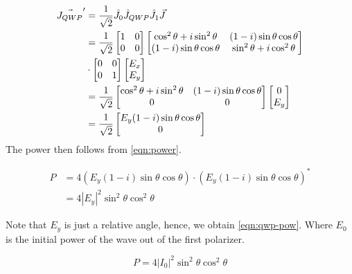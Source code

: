 \documentclass[aip, cp, amsmath, amssymb, reprint]{revtex4-2}
\begin{document}
        \begin{align*}
            \vec{J_{QWP}}' &= \frac{1}{\sqrt{2}}\hat{J_0}\hat{J}_{QWP}\hat{J}_1\vec{J} \\
            &= \frac{1}{\sqrt{2}}\begin{bmatrix} 1 & 0 \\ 0 & 0\end{bmatrix}\begin{bmatrix} \cos^2\theta+i\sin^2\theta & (1-i)\sin\theta\cos\theta \\ (1-i)\sin\theta\cos\theta & \sin^2\theta+i\cos^2\theta\end{bmatrix}\\
            &\space\cdot \begin{bmatrix} 0 & 0 \\ 0 & 1\end{bmatrix}\begin{bmatrix} E_x \\ E_y\end{bmatrix} \\
            &= \frac{1}{\sqrt{2}}\begin{bmatrix} \cos^2\theta+i\sin^2\theta & (1-i)\sin\theta\cos\theta \\ 0 & 0\end{bmatrix}\begin{bmatrix} 0 \\ E_y\end{bmatrix} \\
            &= \frac{1}{\sqrt{2}}\begin{bmatrix} E_y(1-i)\sin\theta\cos\theta \\ 0\end{bmatrix}
        \end{align*}
        The power then follows from \eqref{eqn:power}.

        \begin{align*} 
            P &= 4(E_y(1-i)\sin\theta\cos\theta)\cdot(E_y(1-i)\sin\theta\cos\theta)^{*}  \\
            &= 4|E_y|^2\sin^2\theta\cos^2\theta
        \end{align*}

        Note that $E_y$ is just a relative angle, hence, we obtain \eqref{eqn:qwp-pow}. Where $E_0$ is the initial power of the wave out of the first polarizer.

        \begin{equation} \label{eqn:qwp-pow}
            P = 4|I_0|^2\sin^2\theta\cos^2\theta
        \end{equation}
\end{document}
